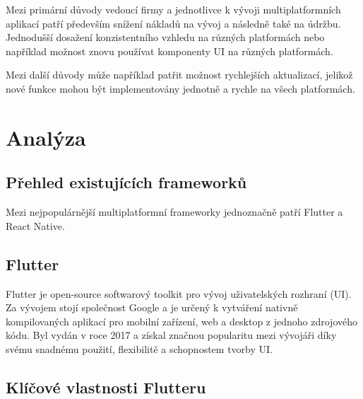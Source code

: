 Mezi primární důvody vedoucí firmy a jednotlivce k vývoji multiplatformních aplikací patří především
snížení nákladů na vývoj a následně také na údržbu. Jednodušší dosažení konzistentního vzhledu
na různých platformách nebo například možnost znovu používat komponenty UI na různých platformách.

Mezi další důvody může například patřit možnost rychlejších aktualizací, jelikož nové funkce mohou být 
implementovány jednotně a rychle na všech platformách. 


\chapter{Analýza}

\section{Přehled existujících frameworků}

Mezi nejpopulárnější multiplatformní frameworky jednoznačně patří Flutter a React Native. \cite{crossPlatformFrameworksStats}
\section{Flutter}
Flutter je open-source softwarový toolkit pro vývoj uživatelských rozhraní (UI). \cite{flutterfaq} Za vývojem stojí společnost Google a je určený k vytváření nativně kompilovaných 
aplikací pro mobilní zařízení, web a desktop z jednoho zdrojového kódu. \cite{flutterfaq}
Byl vydán v roce 2017 a získal značnou popularitu mezi vývojáři díky svému snadnému použití, flexibilitě a schopnostem tvorby UI.

\section*{Klíčové vlastnosti Flutteru}

